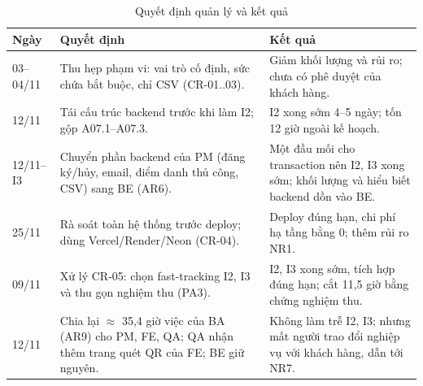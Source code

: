 \begin{table}[H]
\centering\small
\caption{Quyết định quản lý và kết quả}\label{tab:t4-decisions}
\begin{tabularx}{\linewidth}{@{}p{.10\linewidth}XX@{}}
\toprule
\textbf{Ngày} & \textbf{Quyết định} & \textbf{Kết quả}\\\midrule
03--04/11 & Thu hẹp phạm vi: vai trò cố định, sức chứa bắt buộc, chỉ CSV (CR-01..03). & Giảm khối lượng và rủi ro; chưa có phê duyệt của khách hàng.\\
12/11 & Tái cấu trúc backend trước khi làm I2; gộp A07.1--A07.3. & I2 xong sớm 4--5 ngày; tốn 12 giờ ngoài kế hoạch.\\
12/11--I3 & Chuyển phần backend của PM (đăng ký/hủy, email, điểm danh thủ công, CSV) sang BE (AR6). & Một đầu mối cho transaction nên I2, I3 xong sớm; khối lượng và hiểu biết backend dồn vào BE.\\
25/11 & Rà soát toàn hệ thống trước deploy; dùng Vercel/Render/Neon (CR-04). & Deploy đúng hạn, chi phí hạ tầng bằng 0; thêm rủi ro NR1.\\
09/11 & Xử lý CR-05: chọn fast-tracking I2, I3 và thu gọn nghiệm thu (PA3). & I2, I3 xong sớm, tích hợp đúng hạn; cắt 11,5 giờ bằng chứng nghiệm thu.\\
12/11 & Chia lại $\approx$ 35,4 giờ việc của BA (AR9) cho PM, FE, QA; QA nhận thêm trang quét QR của FE; BE giữ nguyên. & Không làm trễ I2, I3; nhưng mất người trao đổi nghiệp vụ với khách hàng, dẫn tới NR7.\\
\bottomrule
\end{tabularx}
\end{table}
